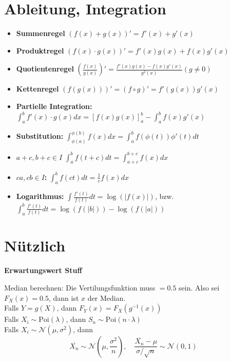 \section{Ableitung, Integration}

\begin{itemize}
 	\item \textbf{Summenregel} $(f(x)+g(x))' = f'(x) + g'(x)$
    \item \textbf{Produktregel} $(f(x)\cdot g(x))' = f'(x)g(x) + f(x)g'(x)$
    \item \textbf{Quotientenregel} $\left(\frac{f(x)}{g(x)}\right)' = \frac{f'(x)g(x) - f(x)g'(x)}{g^2(x)}(g\neq 0)$
    \item \textbf{Kettenregel} $(f(g(x)))' = (f\circ g)' = f'(g(x))g'(x)$
\end{itemize}

\begin{itemize}
  \item \textbf{Partielle Integration:} $\int_a^b f'(x)\cdot g(x)dx = \left[f(x)g(x)\right]_a^b - \int_a^b f(x)g'(x)$
  \item \textbf{Substitution:} $\int_{\phi(a)}^{\phi(b)} f(x)dx = \int_a^b f(\phi(t))\phi '(t) dt$
  \item \textbf{$a+c, b+c \in I$} $\int_a^b f(t+c)dt = \int_{a+c}^{b+c} f(x)dx$
  \item \textbf{$ca,cb\in I$: } $\int_a^b f(ct)dt = \frac{1}{c}f(x)dx$
  \item \textbf{Logarithmus: }\;$\int\frac{f'(t)}{f(t)}dt = \log(|f(x)|)$, bzw. $\int_a^b\frac{f'(t)}{f(t)}dt = \log(f(|b|)) - \log(f(|a|))$
\end{itemize}

\section{Nützlich}

\textbf{Erwartungswert Stuff}



Median berechnen: Die Vertilungsfunktion muss $= 0.5$ sein. Also sei $F_X(x) = 0.5$, dann ist $x$ der Median.\\

Falls $Y = g(X)$, dann $F_Y(x) = F_X(g^{-1}(x))$\\

Falls $X_i \sim \text{Poi}(\lambda)$, dann $S_n \sim \text{Poi}(n \cdot \lambda)$
\\

Falls $X_i \sim \mathcal{N}(\mu, \sigma^2)$, dann $$\overline{X_n} \sim \mathcal{N}(\mu, \frac{\sigma^2}{n}),\quad\frac{\overline{X_n}-\mu}{\sigma / \sqrt{n}} \sim \mathcal{N}(0, 1)$$

